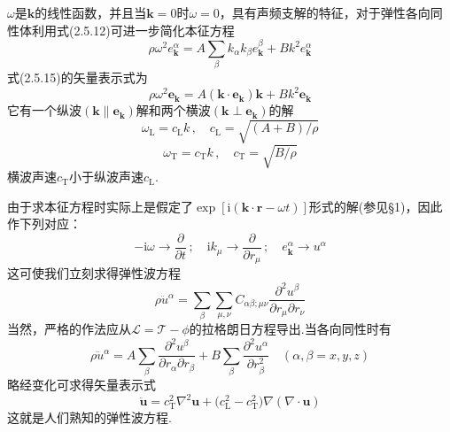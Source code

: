 $\omega$是$\boldsymbol{k}$的线性函数，并且当$\boldsymbol{k}=0$时$\omega=0$，具有声频支解的特征，对于弹性各向同性体利用式(2.5.12)可进一步简化本征方程
\begin{equation}
  \rho\omega^2e_{\boldsymbol{k}}^{\alpha}
  =A\sum_{\beta}k_{\alpha}k_{\beta}e_{\boldsymbol{k}}^{\beta}
  +Bk^2e_{\boldsymbol{k}}^{\alpha}
\end{equation}
式(2.5.15)的矢量表示式为
\begin{equation}
  \rho\omega^2\boldsymbol{e}_{\boldsymbol{k}}
  =A(\boldsymbol{k}\cdot\boldsymbol{e}_{\boldsymbol{k}})\boldsymbol{k}
  +Bk^2\boldsymbol{e}_{\boldsymbol{k}}
\end{equation}
它有一个纵波$(\boldsymbol{k}\parallel\boldsymbol{e}_{\boldsymbol{k}})$解和两个横波$(\boldsymbol{k}\perp\boldsymbol{e}_{\boldsymbol{k}})$的解
\begin{equation}
  \omega_{\mathrm{L}}=c_{\mathrm{L}}k\,,\quad
  c_{\mathrm{L}}=\sqrt{(A+B)/\rho}
\end{equation}
\begin{equation}
  \omega_{\mathrm{T}}=c_{\mathrm{T}}k\,,\quad
  c_{\mathrm{T}}=\sqrt{B/\rho}
\end{equation}
横波声速$c_{\mathrm{T}}$小于纵波声速$c_{\mathrm{L}}$.

由于求本征方程时实际上是假定了$\exp[\mathrm{i}(\boldsymbol{k}\cdot\boldsymbol{r}-\omega t)]$形式的解(参见§1)，因此作下列对应：
\begin{equation*}
  -\mathrm{i}\omega\to\frac{\partial}{\partial t}\,;\quad
  \mathrm{i}k_{\mu}\to\frac{\partial}{\partial r_{\mu}}\,;\quad
  e_{\boldsymbol{k}}^{\alpha}\to u^{\alpha}
\end{equation*}
这可使我们立刻求得弹性波方程
\begin{equation}
  \rho\ddot{u}^{\alpha}=\sum_{\beta}\sum_{\mu,\nu}C_{\alpha\beta;\mu\nu}
  \frac{\partial^2u^{\beta}}{\partial r_{\mu}\partial r_{\nu}}
\end{equation}
当然，严格的作法应从$\mathscr{L}=\mathscr{T}-\phi$的拉格朗日方程导出.当各向同性时有
\begin{equation}
  \rho\ddot{u}^{\alpha}=A\sum_{\beta}
  \frac{\partial^2u^{\beta}}{\partial r_{\alpha}\partial r_{\beta}}
  +B\sum_{\beta}\frac{\partial^2u^{\alpha}}{\partial r_{\beta}^2}
  \quad(\alpha,\beta=x,y,z)
\end{equation}
略经变化可求得矢量表示式
\begin{equation}
  \ddot{\boldsymbol{u}}=c_{\mathrm{T}}^2\nabla^2\boldsymbol{u}
  +\bigl(c_{\mathrm{L}}^2-c_{\mathrm{T}}^2\bigr)\nabla(\nabla\cdot\boldsymbol{u})
\end{equation}
这就是人们熟知的弹性波方程.

